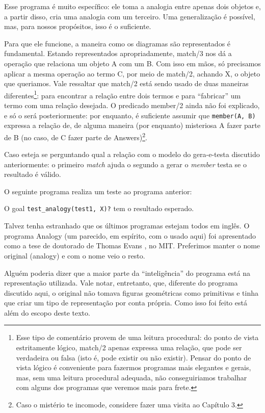 \documentclass{article}
\theoremstyle{remark}
\theoremstyle{theorem}
\begin{document}


Esse programa é muito específico: ele toma a analogia entre apenas dois objetos e, a partir disso, cria uma analogia com um terceiro. Uma generalização é possível, mas, para nossos propósitos, isso é o suficiente.

Para que ele funcione, a maneira como os diagramas são representados é fundamental. Estando representados apropriadamente, match/3 nos dá a operação que relaciona um objeto A com um B. Com isso em mãos, só precisamos aplicar a mesma operação ao termo C, por meio de match/2, achando X, o objeto que queriamos. Vale ressaltar que match/2 está sendo usado de duas maneiras diferentes\footnote{Esse tipo de comentário provem de uma leitura procedural: do ponto de
  vista estritamente lógico, match/2 apenas expressa uma relação, que pode ser verdadeira ou falsa (isto é, pode existir ou não existir). Pensar do ponto de vista lógico é conveniente para fazermos programas mais elegantes e gerais, mas, sem uma leitura procedural adequada, não conseguiriamos trabalhar com alguns dos programas que veremos mais para frete.}: para encontrar a relação entre dois termos e para ``fabricar'' um termo com uma relação
desejada. O predicado member/2 ainda não foi explicado, e só o será posteriormente: por enquanto, é suficiente assumir que {\tt member(A, B)} expressa a relação de, de alguma maneira (por enquanto) misteriosa A fazer parte de B (no caso, de C fazer parte de Answers)\footnote{Caso o mistério te incomode, considere fazer uma visita ao Capítulo 3.}.

Caso esteja se perguntando qual a relação com o modelo do gera-e-testa discutido anteriormente: o primeiro \textit{match} ajuda o segundo a gerar o \textit{member} testa se o resultado é válido.

O seguinte programa realiza um teste ao programa anterior:



O goal {\tt test\_analogy(test1, X)?} tem o resultado esperado.

Talvez tenha estranhado que os últimos programas estejam todos em inglês. O programa Analogy (um parecido, em espírito, com o usado aqui) foi apresentado como a tese de doutorado de Thomas Evans \cite{evans}, no MIT. Preferimos manter o nome original (analogy) e com o nome veio o resto.

Alguém poderia dizer que a maior parte da ``inteligência'' do programa está na representação utilizada.
Vale notar, entretanto, que, diferente do programa discutido aqui, o original não tomava figuras geométricas como
primitivas e tinha que criar um tipo de representação por conta própria. Como isso foi feito está além do escopo deste texto.
\end{document}
